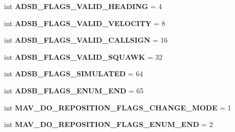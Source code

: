 \begin{DoxyCompactItemize}
\item 
\mbox{\label{namespacepymavlink_1_1dialects_1_1v10_a56838a28bae7fe96b1762961708039c5}} 
int {\bfseries A\+D\+S\+B\+\_\+\+F\+L\+A\+G\+S\+\_\+\+V\+A\+L\+I\+D\+\_\+\+H\+E\+A\+D\+I\+NG} = 4
\item 
\mbox{\label{namespacepymavlink_1_1dialects_1_1v10_afb0f75b520ac5b3e39a8e29d4eabb9f7}} 
int {\bfseries A\+D\+S\+B\+\_\+\+F\+L\+A\+G\+S\+\_\+\+V\+A\+L\+I\+D\+\_\+\+V\+E\+L\+O\+C\+I\+TY} = 8
\item 
\mbox{\label{namespacepymavlink_1_1dialects_1_1v10_a0e27dbb4ac7f77e7ed89d6cc48801d4b}} 
int {\bfseries A\+D\+S\+B\+\_\+\+F\+L\+A\+G\+S\+\_\+\+V\+A\+L\+I\+D\+\_\+\+C\+A\+L\+L\+S\+I\+GN} = 16
\item 
\mbox{\label{namespacepymavlink_1_1dialects_1_1v10_a281d03eb54739571d4232e028eca5079}} 
int {\bfseries A\+D\+S\+B\+\_\+\+F\+L\+A\+G\+S\+\_\+\+V\+A\+L\+I\+D\+\_\+\+S\+Q\+U\+A\+WK} = 32
\item 
\mbox{\label{namespacepymavlink_1_1dialects_1_1v10_a1ae295d0fa7f36ad5b9925df81be399b}} 
int {\bfseries A\+D\+S\+B\+\_\+\+F\+L\+A\+G\+S\+\_\+\+S\+I\+M\+U\+L\+A\+T\+ED} = 64
\item 
\mbox{\label{namespacepymavlink_1_1dialects_1_1v10_a9153f3331ba9b42236d74f335eea77ad}} 
int {\bfseries A\+D\+S\+B\+\_\+\+F\+L\+A\+G\+S\+\_\+\+E\+N\+U\+M\+\_\+\+E\+ND} = 65
\item 
\mbox{\label{namespacepymavlink_1_1dialects_1_1v10_a2b395d21d4f8b7a13bc6d01bcfbfff74}} 
int {\bfseries M\+A\+V\+\_\+\+D\+O\+\_\+\+R\+E\+P\+O\+S\+I\+T\+I\+O\+N\+\_\+\+F\+L\+A\+G\+S\+\_\+\+C\+H\+A\+N\+G\+E\+\_\+\+M\+O\+DE} = 1
\item 
\mbox{\label{namespacepymavlink_1_1dialects_1_1v10_adb952e1ea4161b16efbe59d867455fde}} 
int {\bfseries M\+A\+V\+\_\+\+D\+O\+\_\+\+R\+E\+P\+O\+S\+I\+T\+I\+O\+N\+\_\+\+F\+L\+A\+G\+S\+\_\+\+E\+N\+U\+M\+\_\+\+E\+ND} = 2
\item 

\end{DoxyCompactItemize}
